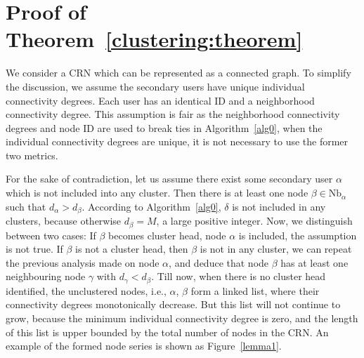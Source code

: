 \documentclass[10pt,journal,compsoc]{IEEEtran}
\makeatletter
\theoremstyle{mytheoremstyle}
\theoremstyle{mytheoremstyle}
\theoremstyle{mytheoremstyle}
\renewenvironment{proof}[1][\proofname]{%
      \par\pushQED{\qed}\fontfamily{ptm}\selectfont%
      \topsep6\p@\@plus6\p@\relax
      \trivlist\item[\hskip\labelsep\bfseries#1\@addpunct{.}]%
      \ignorespaces
    }{%
      \popQED\endtrivlist\@endpefalse
    }
\newcommand{\ie}{i.e., }
\makeatother
\begin{document}
\section*{Proof of Theorem~\ref{clustering:theorem}}
\label{proof_clustering:theorem}
\begin{proof}
We consider a CRN which can be represented as a connected graph.
To simplify the discussion, we assume the secondary users have unique individual connectivity degrees. 
Each user has an identical ID and a neighborhood connectivity degree.
This assumption is fair as the neighborhood connectivity degrees and node ID are used to break ties in Algorithm~\ref{alg0}, when the individual connectivity degrees are unique, it is not necessary to use the former two metrics. 

For the sake of contradiction, let us assume there exist some secondary user $\alpha$ which is not included into any cluster.
Then there is at least one node $\beta\in \text{Nb}_\alpha$ such that $d_{\alpha} > d_{\beta}$. 
According to Algorithm~\ref{alg0}, $\delta$ is not included in any clusters, because otherwise $d_{\beta} = M$, a large positive integer.
Now, we distinguish between two cases: 
If $\beta$ becomes cluster head, node $\alpha$ is included, the assumption is not true.
If $\beta$ is not a cluster head, then $\beta$ is not in any cluster, we can repeat the previous analysis made on node $\alpha$, and deduce that node $\beta$ has at least one neighbouring node $\gamma$ with $d_{\gamma} < d_{\beta}$.
Till now, when there is no cluster head identified, the unclustered nodes, \ie $\alpha$, $\beta$ form a linked list, where their connectivity degrees monotonically decrease.
But this list will not continue to grow, because the minimum individual connectivity degree is zero, and the length of this list is upper bounded by the total number of nodes in the CRN.
An example of the formed node series is shown as Figure~\ref{lemma1}.


\end{proof}
\end{document}

